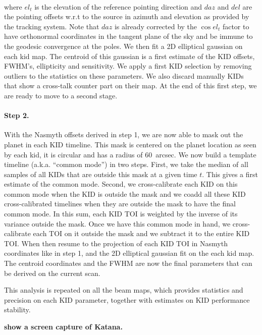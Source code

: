\\

where $el_t$ is the elevation of the reference pointing direction and $daz$ and
$del$ are the pointing offsets w.r.t to the source in azimuth and elevation as
provided by the tracking system. Note that $daz$ is already corrected by the
$\cos el_t$ factor to have orthonormal coordinates in the tangent plane of the sky
and be immune to the geodesic convergence at the poles. We then fit a 2D
elliptical gaussian on each kid map. The centroid of this gaussian is a first
estimate of the KID offsets, FWHM's, ellipticity and sensitivity. We apply a
first KID selection by removing outliers to the statistics on these
parameters. We also discard manually KIDs that show a cross-talk counter part on
their map. At the end of this first step, we are ready to move to a second
stage.

\paragraph{Step 2.} With the Nasmyth offsets derived in step 1, we are now able to
mask out the planet in each KID timeline. This mask is centered on the planet
location as seen by each kid, it is circular and has a radius of 60~arcsec. We
now build a template timeline (a.k.a. ``common mode'') in two steps. First, we
take the median of all samples of all KIDs that are outside this mask at a given
time $t$. This gives a first estimate of the common mode. Second, we
cross-calibrate each KID on this common mode when the KID is outside the mask
and we coadd all these KID cross-calibrated timelines when they are outside the
mask to have the final common mode. In this sum, each KID TOI is weighted by the
inverse of its variance outside the mask. Once we have this common mode in hand,
we cross-calibrate each TOI on it outside the mask and we subtract it to the
entire KID TOI. When then resume to the projection of each KID TOI in Nasmyth
coordinates like in step 1, and the 2D elliptical gaussian fit on the each kid
map. The centroid coordinates and the FWHM are now the final parameters that can
be derived on the current scan.

This analysis is repeated on all the beam maps, which provides statistics and
precision on each KID parameter, together with estimates on KID performance stability.

{\bf show a screen capture of Katana.}\\


